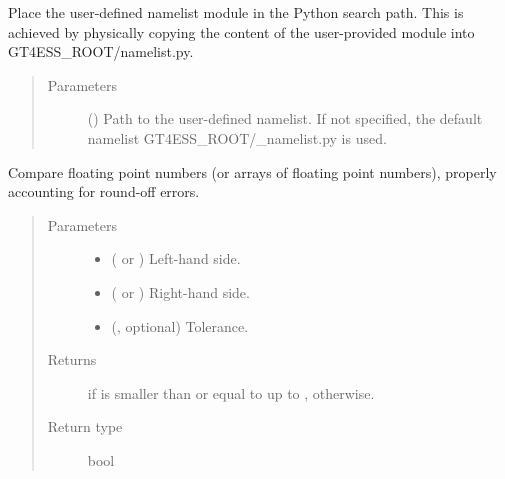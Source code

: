 \documentclass[letterpaper,10pt,english]{sphinxmanual}
\begin{document}
\begin{fulllineitems}
\label{\detokenize{api:utils.set_namelist}}
Place the user-defined namelist module in the Python search path.
This is achieved by physically copying the content of the user-provided module into GT4ESS\_ROOT/namelist.py.
\begin{quote}\begin{description}
\item[{Parameters}] \leavevmode
{} () \textendash{} Path to the user-defined namelist. If not specified, the default namelist GT4ESS\_ROOT/\_namelist.py is used.

\end{description}\end{quote}

\end{fulllineitems}


\begin{fulllineitems}
\label{\detokenize{api:utils.smaller_or_equal_than}}
Compare floating point numbers (or arrays of floating point numbers), properly accounting for round-off errors.
\begin{quote}\begin{description}
\item[{Parameters}] \leavevmode\begin{itemize}
\item {} 
 ( or ) \textendash{} Left-hand side.

\item {} 
 ( or ) \textendash{} Right-hand side.

\item {} 
 (, optional) \textendash{} Tolerance.

\end{itemize}

\item[{Returns}] \leavevmode
{} if  is smaller than or equal to  up to ,  otherwise.

\item[{Return type}] \leavevmode
bool

\end{description}\end{quote}

\end{fulllineitems}
\end{document}
